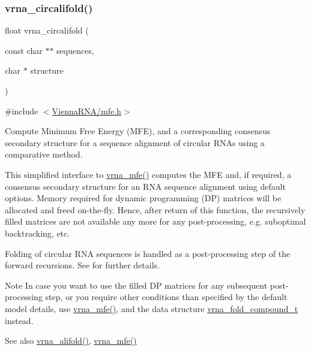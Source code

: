 \subsubsection{\texorpdfstring{vrna\+\_\+circalifold()}{vrna\_circalifold()}}
{\footnotesize\ttfamily float vrna\+\_\+circalifold (\begin{DoxyParamCaption}\item[{const char $\ast$$\ast$}]{sequences,  }\item[{char $\ast$}]{structure }\end{DoxyParamCaption})}



{\ttfamily \#include $<$\hyperlink{mfe_8h}{Vienna\+R\+N\+A/mfe.\+h}$>$}



Compute Minimum Free Energy (M\+FE), and a corresponding consensus secondary structure for a sequence alignment of circular R\+N\+As using a comparative method. 

This simplified interface to \hyperlink{group__mfe__global_gabd3b147371ccf25c577f88bbbaf159fd}{vrna\+\_\+mfe()} computes the M\+FE and, if required, a consensus secondary structure for an R\+NA sequence alignment using default options. Memory required for dynamic programming (DP) matrices will be allocated and free\textquotesingle{}d on-\/the-\/fly. Hence, after return of this function, the recursively filled matrices are not available any more for any post-\/processing, e.\+g. suboptimal backtracking, etc.

Folding of circular R\+NA sequences is handled as a post-\/processing step of the forward recursions. See \cite{hofacker:2006} for further details.

\begin{DoxyNote}{Note}
In case you want to use the filled DP matrices for any subsequent post-\/processing step, or you require other conditions than specified by the default model details, use \hyperlink{group__mfe__global_gabd3b147371ccf25c577f88bbbaf159fd}{vrna\+\_\+mfe()}, and the data structure \hyperlink{group__fold__compound_ga1b0cef17fd40466cef5968eaeeff6166}{vrna\+\_\+fold\+\_\+compound\+\_\+t} instead.
\end{DoxyNote}
\begin{DoxySeeAlso}{See also}
\hyperlink{group__mfe__global_ga6c9d3bef3e92c6d423ffac9f981418c1}{vrna\+\_\+alifold()}, \hyperlink{group__mfe__global_gabd3b147371ccf25c577f88bbbaf159fd}{vrna\+\_\+mfe()}
\end{DoxySeeAlso}

